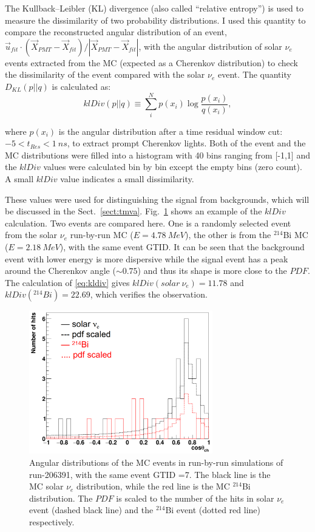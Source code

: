 The Kullback–Leibler (KL) divergence (also called ``relative entropy'') is used to measure the dissimilarity of two probability distributions\cite{murphy2012machine}. I used this quantity to compare the reconstructed angular distribution of an event, $\vec{u}_{fit}\cdot(\vec{X}_{PMT}-\vec{X}_{fit})/|\vec{X}_{PMT}-\vec{X}_{fit}|$, with the angular distribution of solar $\nu_e$ events extracted from the MC (expected as a Cherenkov distribution) to check the dissimilarity of the event compared with the solar $\nu_e$ event. The quantity $D_{KL}(p||q)$ is calculated as: 
\begin{equation}\label{eq:kldiv}
klDiv(p||q) \equiv \sum_{i}^N p(x_i)\log{\frac{p(x_i)}{q(x_i)}},
\end{equation}

where $p(x_i)$ is the angular distribution after a time residual window cut: $-5<t_{Res}<1~ns$, to extract prompt Cherenkov lights. Both of the event and the MC distributions were filled into a histogram with 40 bins ranging from [-1,1] and the $klDiv$ values were calculated bin by bin except the empty bins (zero count). A small $klDiv$ value indicates a small dissimilarity.

These values were used for distinguishing the signal from backgrounds, which will be discussed in the Sect.~\ref{sect:tmva}. Fig.~\ref{kLdiv_example} shows an example of the $klDiv$ calculation. Two events are compared here. One is a randomly selected event from the solar $\nu_e$ run-by-run MC ($E=4.78~MeV$), the other is from the $^{214}$Bi MC ($E=2.18~MeV$), with the same event GTID. It can be seen that the background event with lower energy is more dispersive while the signal event has a peak around the Cherenkov angle ($\sim 0.75$) and thus its shape is more close to the $PDF$. The calculation of \ref{eq:kldiv} gives $klDiv(solar~\nu_e)=11.78$ and $klDiv(^{214}Bi)=22.69$, which verifies the observation.

\begin{figure}[!htb]
	\centering
	\includegraphics[width=8cm]{klDiv_example.png}
	\caption[Angular distributions of the MC events in run-by-run simulations.]{Angular distributions of the MC events in run-by-run simulations of run-206391, with the same event GTID =7. The black line is the MC solar $\nu_e$ distribution, while the red line is the MC $^{214}$Bi distribution. The $PDF$ is scaled to the number of the hits in solar $\nu_e$ event (dashed black line) and the $^{214}$Bi event (dotted red line) respectively.}
	\label{kLdiv_example}
\end{figure}


